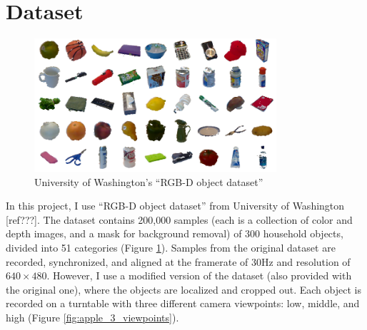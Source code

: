 \section{Dataset}\label{sec:dataset}

\begin{figure}
	\centering
    \includegraphics[width=0.8\textwidth]{images/rgbd_dataset}
    \caption{University of Washington's ``RGB-D object dataset''}
    \label{fig:rgb_dataset}
\end{figure}

In this project, I use ``RGB-D object dataset'' from University of Washington [ref???]. The dataset contains 200,000 samples (each is a collection of color and depth images, and a mask for background removal) of 300 household objects, divided into 51 categories (Figure \ref{fig:rgb_dataset}). Samples from the original dataset are recorded, synchronized, and aligned at the framerate of 30Hz and resolution of $640 \times 480$. However, I use a modified version of the dataset (also provided with the original one), where the objects are localized and cropped out. Each object is recorded on a turntable with three different camera viewpoints: low, middle, and high (Figure \ref{fig:apple_3_viewpoints}).

